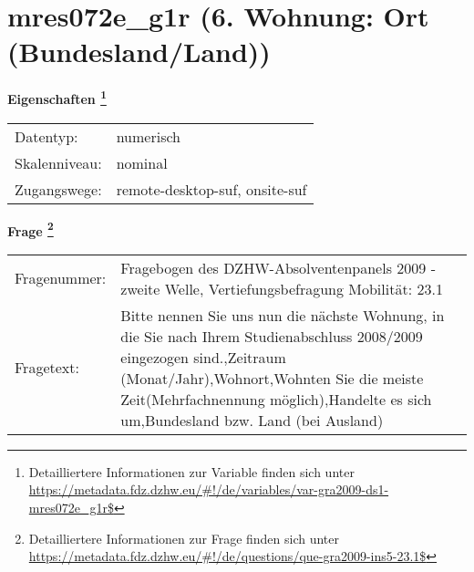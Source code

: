 
    \setcounter{footnote}{0}

    \vspace*{-1.8cm}
	\section{mres072e\_g1r (6. Wohnung: Ort (Bundesland/Land))}
	\label{section:mres072e_g1r}



    \vspace*{0.5cm}
    \noindent\textbf{Eigenschaften
	\footnote{Detailliertere Informationen zur Variable finden sich unter
		\url{https://metadata.fdz.dzhw.eu/\#!/de/variables/var-gra2009-ds1-mres072e_g1r$}}}\\
	\begin{tabularx}{\hsize}{@{}lX}
	Datentyp: & numerisch \\
	Skalenniveau: & nominal \\
	Zugangswege: &
	  remote-desktop-suf, 
	  onsite-suf
 \\
    \end{tabularx}



				\vspace*{0.5cm}
                \noindent\textbf{Frage
	                \footnote{Detailliertere Informationen zur Frage finden sich unter
		              \url{https://metadata.fdz.dzhw.eu/\#!/de/questions/que-gra2009-ins5-23.1$}}}\\
				\begin{tabularx}{\hsize}{@{}lX}
					Fragenummer: &
					  Fragebogen des DZHW-Absolventenpanels 2009 - zweite Welle, Vertiefungsbefragung Mobilität:
					  23.1
 \\
					Fragetext: & Bitte nennen Sie uns nun die nächste Wohnung, in die Sie nach Ihrem Studienabschluss 2008/2009 eingezogen sind.,Zeitraum (Monat/Jahr),Wohnort,Wohnten Sie die meiste Zeit(Mehrfachnennung möglich),Handelte es sich um,Bundesland bzw. Land (bei Ausland) \\
				\end{tabularx}





